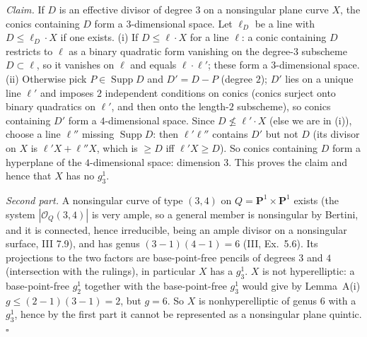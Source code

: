 \documentclass[11pt]{article}
\begin{document}
\emph{Claim.} If $D$ is an effective divisor of degree $3$ on a nonsingular plane curve $X$, the conics containing $D$ form a $3$-dimensional space. Let $\ell_D$ be a line with $D\le\ell_D\cdot X$ if one exists. (i) If $D\le\ell\cdot X$ for a line $\ell$: a conic containing $D$ restricts to $\ell$ as a binary quadratic form vanishing on the degree-$3$ subscheme $D\subset\ell$, so it vanishes on $\ell$ and equals $\ell\cdot\ell'$; these form a $3$-dimensional space. (ii) Otherwise pick $P\in\operatorname{Supp}D$ and $D'=D-P$ (degree $2$); $D'$ lies on a unique line $\ell'$ and imposes $2$ independent conditions on conics (conics surject onto binary quadratics on $\ell'$, and then onto the length-$2$ subscheme), so conics containing $D'$ form a $4$-dimensional space. Since $D\not\le\ell'\cdot X$ (else we are in (i)), choose a line $\ell''$ missing $\operatorname{Supp}D$: then $\ell'\ell''$ contains $D'$ but not $D$ (its divisor on $X$ is $\ell'X+\ell''X$, which is $\ge D$ iff $\ell'X\ge D$). So conics containing $D$ form a hyperplane of the $4$-dimensional space: dimension $3$. This proves the claim and hence that $X$ has no $g^1_3$.

\emph{Second part.} A nonsingular curve of type $(3,4)$ on $Q=\mathbf P^1\times\mathbf P^1$ exists (the system $|\mathcal O_Q(3,4)|$ is very ample, so a general member is nonsingular by Bertini, and it is connected, hence irreducible, being an ample divisor on a nonsingular surface, III 7.9), and has genus $(3-1)(4-1)=6$ (III, Ex.~5.6). Its projections to the two factors are base-point-free pencils of degrees $3$ and $4$ (intersection with the rulings), in particular $X$ has a $g^1_3$. $X$ is not hyperelliptic: a base-point-free $g^1_2$ together with the base-point-free $g^1_3$ would give by Lemma~A(i) $g\le(2-1)(3-1)=2$, but $g=6$. So $X$ is nonhyperelliptic of genus $6$ with a $g^1_3$, hence by the first part it cannot be represented as a nonsingular plane quintic. \hfill$\square$
\end{document}
